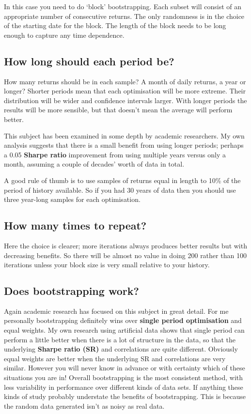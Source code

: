 In this case you need to do ‘block' bootstrapping. Each subset will consist of an appropriate number of consecutive returns. The only randomness is in the choice of the starting date for the block. The length of the block needs to be long enough to capture any time dependence.

\subsection*{How long should each period be?}

How many returns should be in each sample? A month of daily returns, a year or longer? Shorter periods mean that each optimisation will be more extreme. Their distribution will be wider and confidence intervals larger. With longer periods the results will be more sensible, but that doesn't mean the average will perform better.

This subject has been examined in some depth by academic researchers. My own analysis suggests that there is a small benefit from using longer periods; perhaps a 0.05 \textbf{Sharpe ratio} improvement from using multiple years versus only a month, assuming a couple of decades' worth of data in total.

A good rule of thumb is to use samples of returns equal in length to 10\% of the period of history available. So if you had 30 years of data then you should use three year-long samples for each optimisation.

\subsection*{How many times to repeat?}

Here the choice is clearer; more iterations always produces better results but with decreasing benefits. So there will be almost no value in doing 200 rather than 100 iterations unless your block size is very small relative to your history.

\subsection*{Does bootstrapping work?}

Again academic research has focused on this subject in great detail. For me personally bootstrapping definitely wins over \textbf{single period optimisation} and equal weights. My own research using artificial data shows that single period can perform a little better when there is a lot of structure in the data, so that the underlying \textbf{Sharpe ratio (SR)} and correlations are quite different. Obviously equal weights are better when the underlying SR and correlations are very similar. However you will never know in advance or with certainty which of these situations you are in! Overall bootstrapping is the most consistent method, with less variability in performance over different kinds of data sets. If anything these kinds of study probably understate the benefits of bootstrapping. This is because the random data generated isn't as noisy as real data.

